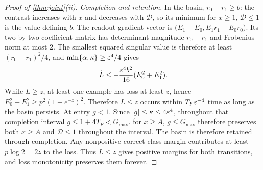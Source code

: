 \begin{proof}[Proof of \cref{thm:joint}(ii)]
\emph{Completion and retention.}
In the basin, $r_0-r_1\ge b$: the contrast increases with $x$ and decreases with $\mathcal D$, so its minimum for $x\ge1$, $\mathcal D\le1$
is the value defining $b$. The readout gradient vector is
$\bigl(E_1-E_0,E_1r_1-E_0r_0\bigr)$.
Its two-by-two coefficient matrix has determinant magnitude $r_0-r_1$ and Frobenius norm at most $2$.
The smallest squared singular value is therefore at least $(r_0-r_1)^2/4$, and
$\min\{\alpha,\kappa\}\ge\varepsilon^4/4$ gives
\[
 \dot L\le-\frac{\varepsilon^4b^2}{16}(E_0^2+E_1^2).
\]
While $L\ge z$, at least one example has loss at least $z$, hence
$E_0^2+E_1^2\ge p^2(1-e^{-z})^2$. Therefore $L\le z$ occurs within $T_F\varepsilon^{-4}$ time as long as the basin persists.
At entry $g<1$. Since $|\dot g|\le\kappa\le4\varepsilon^4$, throughout that completion interval
$g\le1+4T_F<G_{\max}$.  for $x\ge A$, $g\le G_{\max}$ therefore preserves both $x\ge A$ and $\mathcal D\le1$ throughout the interval.
The basin is therefore retained through completion.
Any nonpositive correct-class margin contributes at least $p\log2=2z$ to the loss. Thus $L\le z$ gives positive margins for both transitions, and loss monotonicity preserves them forever.
\end{proof}


